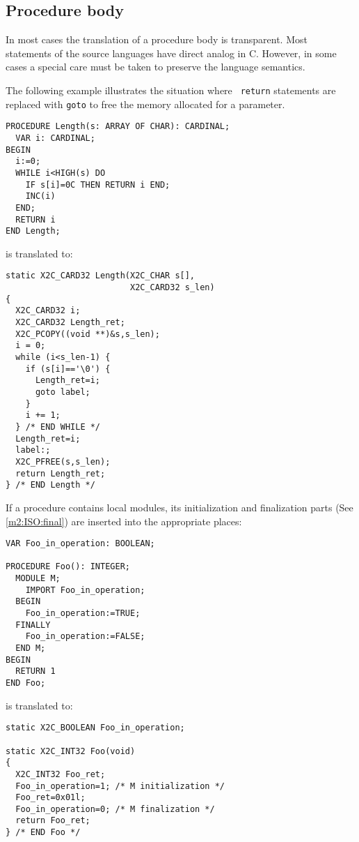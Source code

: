 \subsection{Procedure body}

In most cases the translation of a procedure body is transparent.
Most  statements  of the source  languages have direct analog in C.
However,  in  some cases a special care must be taken to preserve
the language semantics.

The  following  example  illustrates  the  situation  where  {\tt
return}  statements  are  replaced  with  {\tt  goto} to free the
memory allocated for a parameter.
\begin{verbatim}
PROCEDURE Length(s: ARRAY OF CHAR): CARDINAL;
  VAR i: CARDINAL;
BEGIN
  i:=0;
  WHILE i<HIGH(s) DO
    IF s[i]=0C THEN RETURN i END;
    INC(i)
  END;
  RETURN i
END Length;
\end{verbatim}
is translated to:
\begin{verbatim}
static X2C_CARD32 Length(X2C_CHAR s[],
                         X2C_CARD32 s_len)
{
  X2C_CARD32 i;
  X2C_CARD32 Length_ret;
  X2C_PCOPY((void **)&s,s_len);
  i = 0;
  while (i<s_len-1) {
    if (s[i]=='\0') {
      Length_ret=i;
      goto label;
    }
    i += 1;
  } /* END WHILE */
  Length_ret=i;
  label:;
  X2C_PFREE(s,s_len);
  return Length_ret;
} /* END Length */
\end{verbatim}

If a procedure contains local modules, its initialization and
finalization  parts  (See  \ref{m2:ISO:final}) are inserted into the
appropriate places:
\begin{verbatim}
VAR Foo_in_operation: BOOLEAN;

PROCEDURE Foo(): INTEGER;
  MODULE M;
    IMPORT Foo_in_operation;
  BEGIN
    Foo_in_operation:=TRUE;
  FINALLY
    Foo_in_operation:=FALSE;
  END M;
BEGIN
  RETURN 1
END Foo;
\end{verbatim}
is translated to:
\begin{verbatim}
static X2C_BOOLEAN Foo_in_operation;

static X2C_INT32 Foo(void)
{
  X2C_INT32 Foo_ret;
  Foo_in_operation=1; /* M initialization */
  Foo_ret=0x01l;
  Foo_in_operation=0; /* M finalization */
  return Foo_ret;
} /* END Foo */
\end{verbatim}

